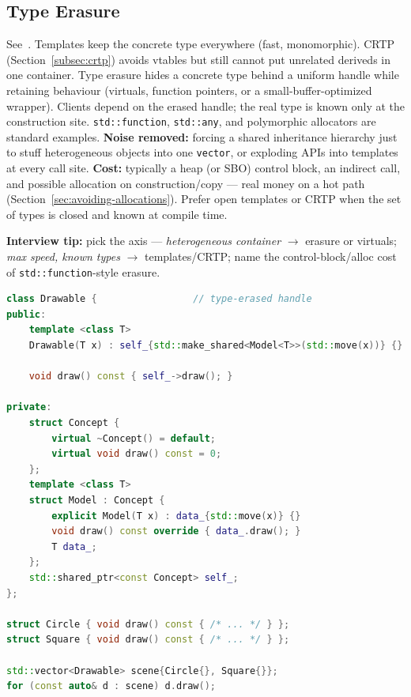 \subsection{Type Erasure}
\label{subsec:type-erasure}
See~\cite{wikibook-type-erasure}.
\newline
Templates keep the concrete type everywhere (fast, monomorphic). CRTP 
(Section~\ref{subsec:crtp}) avoids vtables but still cannot put unrelated 
deriveds in one container. Type erasure hides a concrete type behind a 
uniform handle while retaining behaviour (virtuals, function pointers, or a 
small-buffer-optimized wrapper). Clients depend on the erased handle; the 
real type is known only at the construction site. \texttt{std::function}, 
\texttt{std::any}, and polymorphic allocators are standard examples.
\newline
\textbf{Noise removed:} forcing a shared inheritance hierarchy just to stuff 
heterogeneous objects into one \texttt{vector}, or exploding APIs into 
templates at every call site. 
\textbf{Cost:} typically a heap (or SBO) control block, an indirect call, and 
possible allocation on construction/copy --- real money on a hot path 
(Section~\ref{sec:avoiding-allocations}). Prefer open templates or CRTP when 
the set of types is closed and known at compile time.
\par\noindent\textbf{Interview tip:} pick the axis --- \emph{heterogeneous container} 
$\rightarrow$ erasure or virtuals; \emph{max speed, known types} $\rightarrow$ 
templates/CRTP; name the control-block/alloc cost of \texttt{std::function}-style 
erasure.

\begin{lstlisting}[language=C++]
class Drawable {                 // type-erased handle
public:
    template <class T>
    Drawable(T x) : self_{std::make_shared<Model<T>>(std::move(x))} {}

    void draw() const { self_->draw(); }

private:
    struct Concept {
        virtual ~Concept() = default;
        virtual void draw() const = 0;
    };
    template <class T>
    struct Model : Concept {
        explicit Model(T x) : data_{std::move(x)} {}
        void draw() const override { data_.draw(); }
        T data_;
    };
    std::shared_ptr<const Concept> self_;
};

struct Circle { void draw() const { /* ... */ } };
struct Square { void draw() const { /* ... */ } };

std::vector<Drawable> scene{Circle{}, Square{}};
for (const auto& d : scene) d.draw();
\end{lstlisting}
